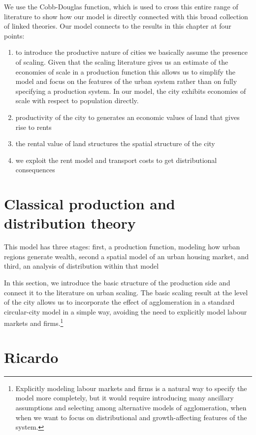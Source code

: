 We use the Cobb-Douglas function, which is used to cross this entire range of literature to show how our  model is directly connected with this broad collection of linked theories. Our model connects to the results in this chapter at four points:
\begin{enumerate}
    \item to introduce  the productive nature of cities we basically assume the presence of scaling. Given  that the scaling literature gives us an estimate of the economies of scale in a production function this allows us to simplify the model and focus on the features of the urban system rather than on fully specifying a production system. In our model, the city  exhibits economies of scale with respect to population directly. 

     \item  productivity of the city to generates an economic values of land that gives rise to rents

    \item  the rental value of land structures the spatial structure of the city

    \item we exploit the rent model and transport costs to get  distributional consequences
\end{enumerate}


\section{Classical production and distribution theory}
This model has three stages: first, a production function, modeling how urban regions generate wealth,  second a spatial model of an urban housing market, and third, an analysis of distribution within that model 

In this section, we introduce the basic structure of the production side and connect it to the literature on urban scaling. The basic scaling result at the level of the city allows us to incorporate the effect of agglomeration in a standard  circular-city model in a simple way, avoiding the need to explicitly model labour markets and firms.\footnote{Explicitly modeling labour markets and firms is a natural way to specify the model more completely, but it would require introducing many ancillary assumptions and selecting among alternative models of agglomeration, when when we want to focus on distributional and growth-affecting features of the system.}


 \section{Ricardo}



